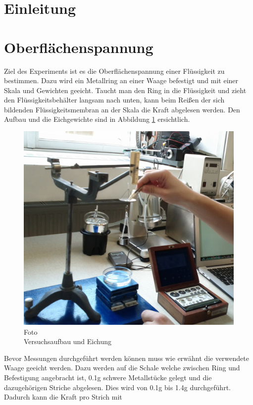 \documentclass[12pt,a4paper]{article}
\begin{document}
\pagebreak
\setlength{\columnsep}{20pt}
\begin{multicols}{2}
\section{Einleitung}

\section{Oberflächenspannung}
Ziel des Experiments ist es die Oberflächenspannung einer Flüssigkeit zu bestimmen. Dazu wird ein Metallring an einer Waage befestigt und mit einer Skala und Gewichten geeicht. Taucht man den Ring in die Flüssigkeit und zieht den Flüssigkeitsbehälter langsam nach unten, kann beim Reißen der sich bildenden Flüssigkeitsmembran an der Skala die Kraft abgelesen werden. Den Aufbau und die Eichgewichte sind in Abbildung \ref{fig:oberflaeche_eichung_aufbau} ersichtlich.
\begin{figure}[H]
	\centering
	\includegraphics[scale=0.2]{./figure/Waageneichung-Aufbau.png}
	\caption{Foto \\Versuchsaufbau und Eichung}
	\label{fig:oberflaeche_eichung_aufbau}
\end{figure}
\noindent
Bevor Messungen durchgeführt werden können muss wie erwähnt die verwendete Waage geeicht werden. Dazu werden auf die Schale welche zwischen Ring und Befestigung angebracht ist, 0.1g schwere Metallstücke gelegt und die dazugehörigen Striche abgelesen. Dies wird von 0.1g bis 1.4g durchgeführt. Dadurch kann die Kraft pro Strich mit

\end{multicols}
\end{document}
